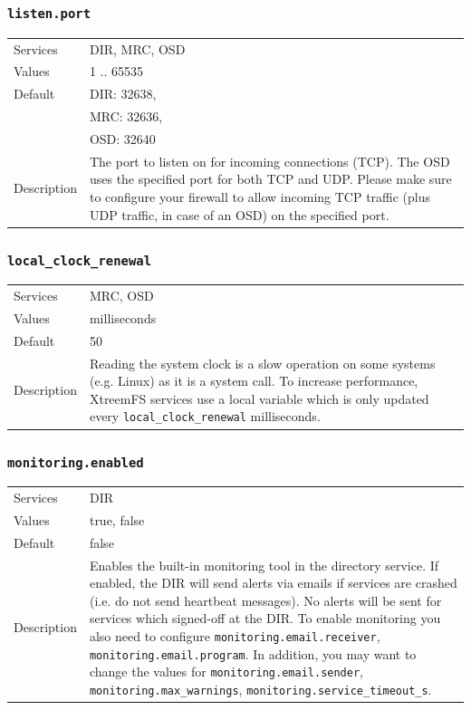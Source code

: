\documentclass[a4paper,10pt]{book}
\begin{document}
\subsubsection{\texttt{listen.port}}
\begin{tabular}{lp{10cm}}
 Services & DIR, MRC, OSD\\
 Values   & 1 .. 65535 \\
 Default  & DIR: 32638,\\
 & MRC: 32636,\\
 & OSD: 32640 \\
 Description & The port to listen on for incoming connections (TCP). The OSD uses the specified port for both TCP and UDP. Please make sure to configure your firewall to allow incoming TCP traffic (plus UDP traffic, in case of an OSD) on the specified port.
\end{tabular}

\subsubsection{\texttt{local\_clock\_renewal}}
\begin{tabular}{lp{10cm}}
 Services & MRC, OSD\\
 Values   & milliseconds \\
 Default  & 50\\
 Description & Reading the system clock is a slow operation on some systems (e.g. Linux) as it is a system call. To increase performance, XtreemFS services use a local variable which is only updated every \texttt{local\_clock\_renewal} milliseconds.
\end{tabular}

\subsubsection{\texttt{monitoring.enabled}}
\begin{tabular}{lp{10cm}}
 Services & DIR\\
 Values   & true, false \\
 Default  & false\\
 Description & Enables the built-in monitoring tool in the directory service. If enabled, the DIR will send alerts via emails if services are crashed (i.e. do not send heartbeat messages). No alerts will be sent for services which signed-off at the DIR. To enable monitoring you also need to configure \texttt{monitoring.email.receiver}, \texttt{monitoring.email.program}. In addition, you may want to change the values for \texttt{monitoring.email.sender}, \texttt{monitoring.max\_warnings}, \texttt{monitoring.service\_timeout\_s}.
\end{tabular}
\end{document}

